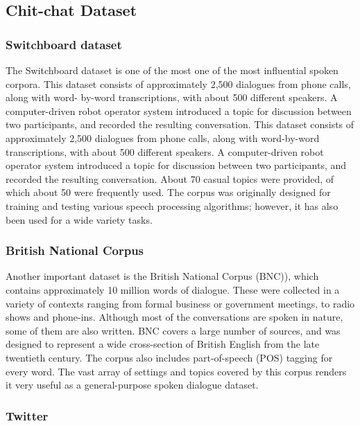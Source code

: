 \documentclass[bsc,frontabs,twoside,singlespacing,parskip,deptreport]{infthesis}     %
\begin{document}
\subsection{Chit-chat Dataset}


\subsubsection{Switchboard dataset}

The Switchboard dataset\cite{godfrey1992switchboard} is one of the most one of the most influential spoken corpora. This dataset consists of approximately 2,500 dialogues from phone calls, along with word- by-word transcriptions, with about 500 different speakers. A computer-driven robot operator system introduced a topic for discussion between two participants, and recorded the resulting conversation. This dataset consists of approximately 2,500 dialogues from phone calls, along with word-by-word transcriptions, with about 500 different speakers. A computer-driven robot operator system introduced a topic for discussion between two participants, and recorded the resulting conversation. About 70 casual topics were provided, of which about 50 were frequently used. The corpus was originally designed for training and testing various speech processing algorithms; however, it has also been used for a wide variety tasks.

\subsubsection{British National Corpus}

Another important dataset is the British National Corpus (BNC)\cite{leech1992100}), which contains approximately 10 million words of dialogue. These were collected in a variety of contexts ranging from formal business or government meetings, to radio shows and phone-ins. Although most of the conversations are spoken in nature, some of them are also written. BNC covers a large number of sources, and was designed to represent a wide cross-section of British English from the late twentieth century. The corpus also includes part-of-speech (POS) tagging for every word. The vast array of settings and topics covered by this corpus renders it very useful as a general-purpose spoken dialogue dataset.

\subsubsection{Twitter}
\end{document}
